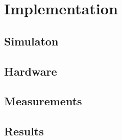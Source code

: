 
\chapter{Implementation}

\section{Simulaton}

\section{Hardware}
\section{Measurements}
\section{Results}
